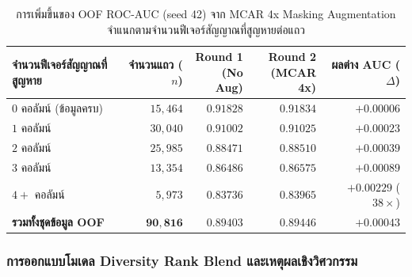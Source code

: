 \begin{table}[htbp]
  \centering
  \small
  \setlength{\tabcolsep}{6pt}
  \caption{การเพิ่มขึ้นของ OOF ROC-AUC (seed 42) จาก MCAR 4x Masking Augmentation จำแนกตามจำนวนฟีเจอร์สัญญาณที่สูญหายต่อแถว}
  \label{tab:t1_mcar_depth}
  \begin{tabular}{@{}p{4.8cm}rrrr@{}}
    \toprule
    \textbf{จำนวนฟีเจอร์สัญญาณที่สูญหาย} & \shortstack[r]{\textbf{จำนวนแถว}\\\textbf{($n$)}} & \shortstack[r]{\textbf{Round 1}\\\textbf{(No Aug)}} & \shortstack[r]{\textbf{Round 2}\\\textbf{(MCAR 4x)}} & \shortstack[r]{\textbf{ผลต่าง AUC}\\\textbf{($\Delta$)}} \\
    \midrule
    $0$ คอลัมน์ (ข้อมูลครบ) & $15,464$ & $0.91828$ & $0.91834$ & $+0.00006$ \\
    $1$ คอลัมน์ & $30,040$ & $0.91002$ & $0.91025$ & $+0.00023$ \\
    $2$ คอลัมน์ & $25,985$ & $0.88471$ & $0.88510$ & $+0.00039$ \\
    $3$ คอลัมน์ & $13,354$ & $0.86486$ & $0.86575$ & $+0.00089$ \\
    $4+$ คอลัมน์ & $5,973$ & $0.83736$ & $0.83965$ & $\mathbf{+0.00229}$ ($38\times$) \\
    \midrule
    \textbf{รวมทั้งชุดข้อมูล OOF} & $\mathbf{90,816}$ & $\mathbf{0.89403}$ & $\mathbf{0.89446}$ & $\mathbf{+0.00043}$ \\
    \bottomrule
  \end{tabular}
\end{table}

\subsubsection{การออกแบบโมเดล Diversity Rank Blend และเหตุผลเชิงวิศวกรรม}

